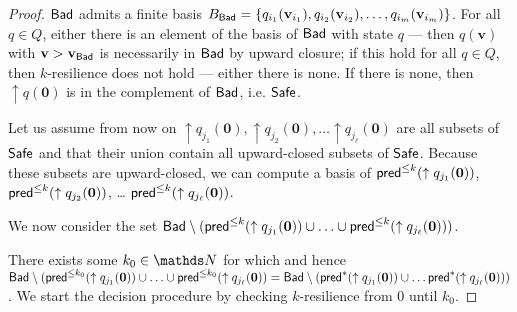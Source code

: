 \begin{proof}
$\textsf{Bad}$ admits a finite basis 
$B_{\textsf{Bad}} = \{ q_{i_1}(\textbf{v}_{i_1}), q_{i_2}(\textbf{v}_{i_2}), \ldots,
q_{i_m}(\textbf{v}_{i_m}) \}$.
For all $q \in Q$, either there is an element of the basis of $\textsf{Bad}$ with state $q$ \----
then $q(\textbf{v})$ with $\textbf{v} > \textbf{v}_{\textsf{Bad}}$ is necessarily in $\textsf{Bad}$ by upward closure; if this hold for all $q \in Q$, then $k$-resilience does not hold \---- either there is none. If there is none, then 
$\uparrow q(\textbf{0})$
 is in the complement of $\textsf{Bad}$, i.e. $\textsf{Safe}$.

Let us assume from now on 
 $\uparrow q_{j_1}(\textbf{0}), \uparrow q_{j_2}(\textbf{0}), \ldots \uparrow q_{j_\ell}(\textbf{0})$ are
all subsets of $\textsf{Safe}$ and that their union contain all upward-closed subsets of $\textsf{Safe}$.
Because these subsets are upward-closed, we can compute a basis of
$\textsf{pred}^{\leq k}(\uparrow q_{j_1}(\textbf{0}))$, $\textsf{pred}^{\leq k}(\uparrow q_{j_2}(\textbf{0}))$, \ldots
$\textsf{pred}^{\leq k}(\uparrow q_{j_\ell}(\textbf{0}))$.


We now consider the set 
$\textsf{Bad} \setminus (\textsf{pred}^{\leq k}(\uparrow q_{j_1}(\textbf{0})) \cup \ldots \cup \textsf{pred}^{\leq k}(\uparrow q_{j_\ell}(\textbf{0})) )$.



There exists some $k_0 \in \N$ for which
and hence
$\textsf{Bad} \setminus (\textsf{pred}^{\leq k_0}(\uparrow q_{j_1}(\textbf{0}))\cup \ldots \cup \textsf{pred}^{\leq k_0}(\uparrow q_{j_\ell}(\textbf{0}))= 
\textsf{Bad} \setminus (\textsf{pred}^{*}(\uparrow q_{j_1}(\textbf{0})) \cup \ldots \textsf{pred}^{*}(\uparrow q_{j_\ell}(\textbf{0})) )$.
We start the decision procedure by checking {\sc $k$-resilience} from $0$ until $k_0$.


\end{proof}
